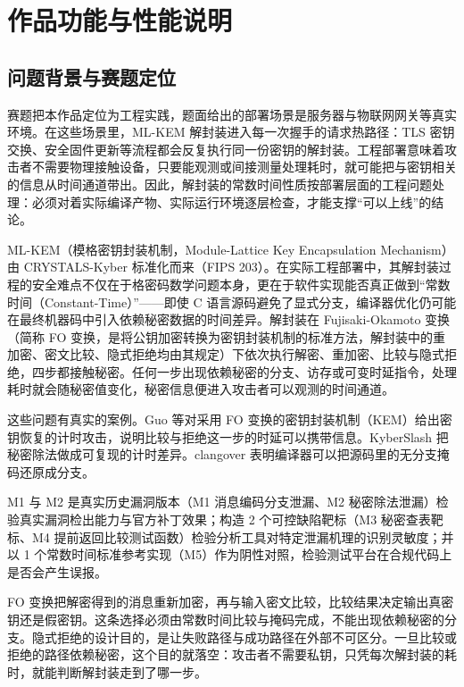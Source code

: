 
\section{作品功能与性能说明}

\subsection{问题背景与赛题定位}

赛题把本作品定位为工程实践，题面给出的部署场景是服务器与物联网网关等真实环境。在这些场景里，ML-KEM 解封装进入每一次握手的请求热路径：TLS 密钥交换、安全固件更新等流程都会反复执行同一份密钥的解封装。工程部署意味着攻击者不需要物理接触设备，只要能观测或间接测量处理耗时，就可能把与密钥相关的信息从时间通道带出。因此，解封装的常数时间性质按部署层面的工程问题处理：必须对着实际编译产物、实际运行环境逐层检查，才能支撑“可以上线”的结论。

ML-KEM（模格密钥封装机制，Module-Lattice Key Encapsulation Mechanism）由 CRYSTALS-Kyber 标准化而来（FIPS 203\cite{fips203,kyber2018}）。在实际工程部署中，其解封装过程的安全难点不仅在于格密码数学问题本身，更在于软件实现能否真正做到“常数时间（Constant-Time）”——即使 C 语言源码避免了显式分支，编译器优化仍可能在最终机器码中引入依赖秘密数据的时间差异。解封装在 Fujisaki-Okamoto 变换（简称 FO 变换，是将公钥加密转换为密钥封装机制的标准方法，解封装中的重加密、密文比较、隐式拒绝均由其规定）下依次执行解密、重加密、比较与隐式拒绝，四步都接触秘密。任何一步出现依赖秘密的分支、访存或可变时延指令，处理耗时就会随秘密值变化，秘密信息便进入攻击者可以观测的时间通道。

这些问题有真实的案例。Guo 等对采用 FO 变换的密钥封装机制（KEM）给出密钥恢复的计时攻击，说明比较与拒绝这一步的时延可以携带信息\cite{guo2020}。KyberSlash 把秘密除法做成可复现的计时差异\cite{kyberslash}。clangover 表明编译器可以把源码里的无分支掩码还原成分支\cite{clangover}。

M1 与 M2 是真实历史漏洞版本（M1 消息编码分支泄漏、M2 秘密除法泄漏）检验真实漏洞检出能力与官方补丁效果；构造 2 个可控缺陷靶标（M3 秘密查表靶标、M4 提前返回比较测试函数）检验分析工具对特定泄漏机理的识别灵敏度；并以 1 个常数时间标准参考实现（M5）作为阴性对照，检验测试平台在合规代码上是否会产生误报。

FO 变换把解密得到的消息重新加密，再与输入密文比较，比较结果决定输出真密钥还是假密钥。这条选择必须由常数时间比较与掩码完成，不能出现依赖秘密的分支。隐式拒绝的设计目的，是让失败路径与成功路径在外部不可区分。一旦比较或拒绝的路径依赖秘密，这个目的就落空：攻击者不需要私钥，只凭每次解封装的耗时，就能判断解封装走到了哪一步。

